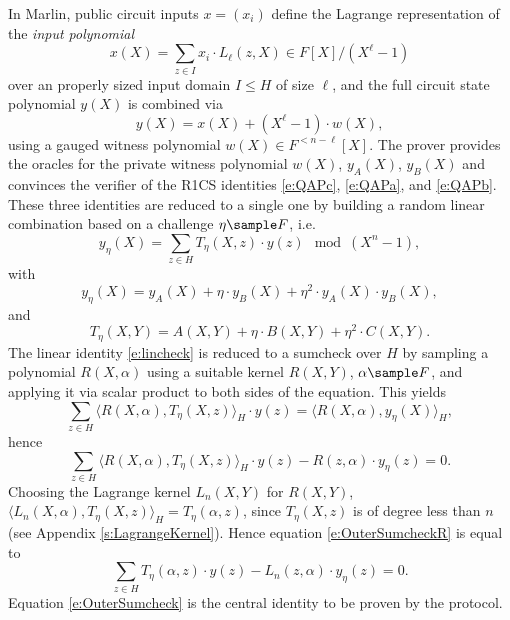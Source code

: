 \documentclass[10pt,article,oneside]{memoir}
\theoremstyle{definition}
\theoremstyle{remark}
\begin{document}
In Marlin, public circuit inputs $x=(x_i)$ define the Lagrange representation of the \textit{input polynomial} 
\[
x(X) = \sum_{z\in I} x_i \cdot L_\ell(z, X) \in F[X]/(X^\ell - 1)
\]
over an properly sized input domain $I\leq H$ of size $\ell$, and the full circuit state polynomial $y(X)$ is combined via
\begin{equation}
y(X) =  x(X) + (X^\ell - 1 )\cdot w(X),
\end{equation}
using a gauged witness polynomial $w(X)\in F^{< n - \ell}[X]$.
The prover provides the oracles for the private witness polynomial $w(X)$, $y_A(X)$, $y_B(X)$ and convinces the verifier of the R1CS identities \eqref{e:QAPc}, \eqref{e:QAPa}, and \eqref{e:QAPb}.
These three identities are reduced to a single one by building a random linear combination based on a challenge $\eta\sample F$, i.e.
\begin{equation}
\label{e:lincheck}
y_\eta(X) = \sum_{z\in H}  T_\eta(X,z) \cdot y(z)  \mod (X^n-1),
\end{equation}
with
\begin{equation*}
y_\eta(X)  = y_A(X) + \eta \cdot y_B(X) + \eta^2\cdot y_A(X)\cdot y_B(X),
\end{equation*}
and
\begin{equation*}
T_\eta (X,Y) =A(X,Y)+ \eta\cdot B(X,Y)+ \eta^2\cdot C(X,Y).
\end{equation*}
The linear identity \eqref{e:lincheck} is reduced to a sumcheck over $H$ by sampling a polynomial $R(X,\alpha)$ using a suitable kernel $R(X,Y)$, $\alpha\sample F$, and applying it via scalar product to both sides of the equation.
This yields
\begin{equation*}
\sum_{z\in H}  \langle R(X,\alpha),T_\eta(X,z)\rangle_H \cdot y(z) 
=\langle R(X,\alpha), y_\eta(X)\rangle_H,
\end{equation*}
hence
\begin{equation}
\label{e:OuterSumcheckR}
\sum_{z\in H}  \langle R(X,\alpha),T_\eta(X,z)\rangle_H \cdot y(z) - R(z,\alpha)\cdot y_\eta(z) = 0.
\end{equation}
Choosing the Lagrange kernel $L_n(X,Y)$ for $R(X,Y)$, $\langle L_n(X,\alpha), T_\eta(X,z)\rangle_H = T_\eta(\alpha,z)$, since $T_\eta(X,z)$ is of degree less than $n$ (see Appendix \ref{s:LagrangeKernel}). 
Hence equation \eqref{e:OuterSumcheckR} is equal to
\begin{equation}
\label{e:OuterSumcheck}
\sum_{z\in H}  T_\eta(\alpha,z) \cdot y(z) -  L_n(z,\alpha)\cdot  y_\eta(z) = 0.
\end{equation}
Equation \eqref{e:OuterSumcheck} is the central identity to be proven by the protocol.
\end{document}
